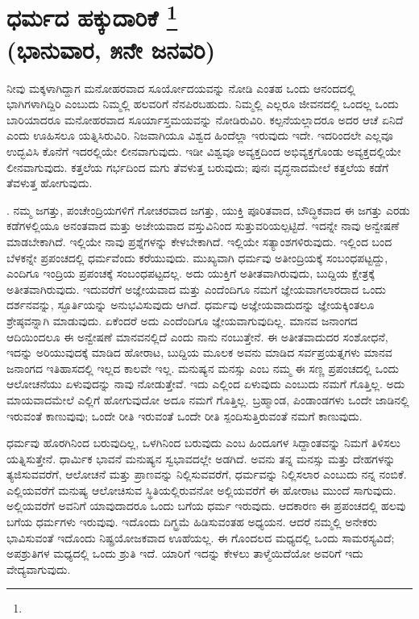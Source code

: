 
\chapter{ಧರ್ಮದ ಹಕ್ಕುದಾರಿಕೆ \protect\footnote{}\\(ಭಾನುವಾರ, ೫ನೇ ಜನವರಿ)}

ನೀವು ಮಕ್ಕಳಾಗಿದ್ದಾಗ ಮನೋಹರವಾದ ಸೂರ್ಯೋದಯವನ್ನು ನೋಡಿ ಎಂತಹ ಒಂದು ಆನಂದದಲ್ಲಿ ಭಾಗಿಗಳಾಗಿದ್ದಿರಿ ಎಂಬುದು ನಿಮ್ಮಲ್ಲಿ ಹಲವರಿಗೆ ನೆನಪಿರಬಹುದು. ನಿಮ್ಮಲ್ಲಿ ಎಲ್ಲರೂ ಜೀವನದಲ್ಲಿ ಒಂದಲ್ಲ ಒಂದು ಬಾರಿಯಾದರೂ ಮನೋಹರವಾದ ಸೂರ್ಯಾಸ್ತಮಯವನ್ನು ನೋಡಿರುವಿರಿ. ಕಲ್ಪನೆಯಲ್ಲಾದರೂ ಅದರ ಆಚೆ ಏನಿದೆ ಎಂದು ಊಹಿಸಲೂ ಯತ್ನಿಸಿರುವಿರಿ. ನಿಜವಾಗಿಯೂ ವಿಶ್ವದ ಹಿಂದೆಲ್ಲಾ ಇರುವುದು ಇದೇ. ಇದರಿಂದಲೇ ಎಲ್ಲವೂ ಉದ್ಭವಿಸಿ ಕೊನೆಗೆ ಇದರಲ್ಲಿಯೇ ಲೀನವಾಗುವುದು. ಇಡೀ ವಿಶ್ವವೂ ಅವ್ಯಕ್ತದಿಂದ ಅಭಿವ್ಯಕ್ತಗೊಂಡು ಅವ್ಯಕ್ತದಲ್ಲಿಯೇ ಲೀನವಾಗುವುದು. ಕತ್ತಲೆಯ ಗರ್ಭದಿಂದ ಮಗು ತೆವಳುತ್ತ ಬರುವುದು; ಪುನಃ ವೃದ್ಧನಾದಮೇಲೆ ಕತ್ತಲೆಯ ಕಡೆಗೆ ತೆವಳುತ್ತ ಹೋಗುವುದು.

. ನಮ್ಮ ಜಗತ್ತು, ಪಂಚೇಂದ್ರಿಯಗಳಿಗೆ ಗೋಚರವಾದ ಜಗತ್ತು, ಯುಕ್ತಿ ಪೂರಿತವಾದ, ಬೌದ್ಧಿಕವಾದ ಈ ಜಗತ್ತು ಎರಡು ಕಡೆಗಳಲ್ಲಿಯೂ ಅನಂತವಾದ ಮತ್ತು ಅಜೇಯವಾದ ವಸ್ತುವಿನಿಂದ ಸುತ್ತುವರಿಯಲ್ಪಟ್ಟಿದೆ. ಇದನ್ನೇ ನಾವು ಅನ್ವೇಷಣೆ ಮಾಡಬೇಕಾಗಿದೆ. ಇಲ್ಲಿಯೇ ನಾವು ಪ್ರಶ್ನೆಗಳನ್ನು ಕೇಳಬೇಕಾಗಿದೆ. ಇಲ್ಲಿಯೇ ಸತ್ಯಾಂಶಗಳಿರುವುದು. ಇಲ್ಲಿಂದ ಬಂದ ಬೆಳಕನ್ನೇ ಪ್ರಪಂಚದಲ್ಲಿ ಧರ್ಮವೆಂದು ಕರೆಯುವುದು. ಮುಖ್ಯವಾಗಿ ಧರ್ಮವು ಅತೀಂದ್ರಿಯಕ್ಕೆ ಸಂಬಂಧಪಟ್ಟದ್ದು, ಎಂದಿಗೂ ಇಂದ್ರಿಯ ಪ್ರಪಂಚಕ್ಕೆ ಸಂಬಂಧಪಟ್ಟದಲ್ಲ. ಅದು ಯುಕ್ತಿಗೆ ಅತೀತವಾಗಿರುವುದು, ಬುದ್ದಿಯ ಕ್ಷೇತ್ರಕ್ಕೆ ಅತೀತವಾಗಿರುವುದು. ಇದುವರೆಗೆ ಅಜ್ಞೇಯವಾದ ಮತ್ತು ಎಂದೆಂದಿಗೂ ನಮಗೆ ಜ್ಞೇಯವಾಗಲಾರದಾದ ಒಂದು ದರ್ಶನವನ್ನು, ಸ್ಫೂರ್ತಿಯನ್ನು ಅನುಭವಿಸುವುದು ಆಗಿದೆ. ಧರ್ಮವು ಅಜ್ಞೇಯವಾದುದನ್ನು ಜ್ಞೇಯಕ್ಕಿಂತಲೂ ಶ್ರೇಷ್ಠವನ್ನಾಗಿ ಮಾಡುವುದು. ಏಕೆಂದರೆ ಅದು ಎಂದೆಂದಿಗೂ ಜ್ಞೇಯವಾಗುವುದಿಲ್ಲ. ಮಾನವ ಜನಾಂಗದ ಆದಿಯಿಂದಲೂ ಈ ಅನ್ವೇಷಣೆ ಮಾನವನಲ್ಲಿದೆ ಎಂದು ನಾನು ನಂಬುತ್ತೇನೆ. ಈ ಅತೀತವಾದುದರ ಸಂಶೋಧನೆ, ಇದನ್ನು ಅರಿಯುವುದಕ್ಕೆ ಮಾಡಿದ ಹೋರಾಟ, ಬುದ್ದಿಯ ಮೂಲಕ ಅವನು ಮಾಡಿದ ಸರ್ವಪ್ರಯತ್ನಗಳು ಮಾನವ ಜನಾಂಗದ ಇತಿಹಾಸದಲ್ಲಿ ಇಲ್ಲದ ಕಾಲವೇ ಇಲ್ಲ. ಮನುಷ್ಯನ ಮನಸ್ಸು ಎಂಬ ನಮ್ಮ ಈ ಸಣ್ಣ ಪ್ರಪಂಚದಲ್ಲಿ ಒಂದು ಆಲೋಚನೆಯು ಏಳುವುದನ್ನು ನಾವು ನೋಡುತ್ತೇವೆ. ಇದು ಎಲ್ಲಿಂದ ಏಳುವುದು ಎಂಬುದು ನಮಗೆ ಗೊತ್ತಿಲ್ಲ. ಅದು ಮಾಯವಾದಮೇಲೆ ಎಲ್ಲಿಗೆ ಹೋಗುವುದೋ ಅದೂ ನಮಗೆ ಗೊತ್ತಿಲ್ಲ. ಬ್ರಹ್ಮಾಂಡ, ಪಿಂಡಾಂಡಗಳು ಒಂದೇ ಜಾಡಿನಲ್ಲಿ ಇರುವಂತೆ ಕಾಣುವುವು; ಒಂದೇ ರೀತಿ ಇರುವಂತೆ ಒಂದೇ ರೀತಿ ಸ್ಪಂದಿಸುತ್ತಿರುವಂತೆ ನಮಗೆ ಕಾಣುವುದು.

ಧರ್ಮವು ಹೊರಗಿನಿಂದ ಬರುವುದಿಲ್ಲ, ಒಳಗಿನಿಂದ ಬರುವುದು ಎಂಬ ಹಿಂದೂಗಳ ಸಿದ್ದಾಂತವನ್ನು ನಿಮಗೆ ತಿಳಿಸಲು ಯತ್ನಿಸುತ್ತೇನೆ. ಧಾರ್ಮಿಕ ಭಾವನೆ ಮನುಷ್ಯನ ಸ್ವಭಾವದಲ್ಲೇ ಅಡಗಿದೆ. ಅವನು ತನ್ನ ಮನಸ್ಸು ಮತ್ತು ದೇಹಗಳನ್ನು ತ್ಯಜಿಸುವವರೆಗೆ, ಆಲೋಚನೆ ಮತ್ತು ಪ್ರಾಣವನ್ನು ನಿಲ್ಲಿಸುವವರೆಗೆ, ಧರ್ಮವನ್ನು ನಿಲ್ಲಿಸಲಾರ ಎಂಬುದು ನನ್ನ ನಂಬಿಕೆ. ಎಲ್ಲಿಯವರೆಗೆ ಮನುಷ್ಯ ಆಲೋಚಿಸುವ ಸ್ಥಿತಿಯಲ್ಲಿರುವನೋ ಅಲ್ಲಿಯವರೆಗೆ ಈ ಹೋರಾಟ ಮುಂದೆ ಸಾಗುವುದು. ಅಲ್ಲಿಯವರೆಗೆ ಅವನಿಗೆ ಯಾವುದಾದರೂ ಒಂದು ಬಗೆಯ ಧರ್ಮ ಇರುವುದು. ಆದಕಾರಣ ಈ ಪ್ರಪಂಚದಲ್ಲಿ ಹಲವು ಬಗೆಯ ಧರ್ಮಗಳು ಇರುವುವು. ಇದೊಂದು ದಿಗ್ಭ್ರಮೆ ಹಿಡಿಸುವಂತಹ ಅಧ್ಯಯನ. ಆದರೆ ನಮ್ಮಲ್ಲಿ ಅನೇಕರು ಭಾವಿಸುವಂತೆ ಇದೊಂದು ನಿಷ್ಪ್ರಯೋಜಕವಾದ ಊಹೆಯಲ್ಲ. ಈ ಗೊಂದಲದ ಮಧ್ಯದಲ್ಲಿ ಒಂದು ಸಾಮರಸ್ಯವಿದೆ; ಅಪಶ್ರುತಿಗಳ ಮಧ್ಯದಲ್ಲಿ ಒಂದು ಶ್ರುತಿ ಇದೆ. ಯಾರಿಗೆ ಇದನ್ನು ಕೇಳಲು ತಾಳ್ಮೆಯಿದೆಯೋ ಅವರಿಗೆ ಇದು ವೇದ್ಯವಾಗುವುದು.

